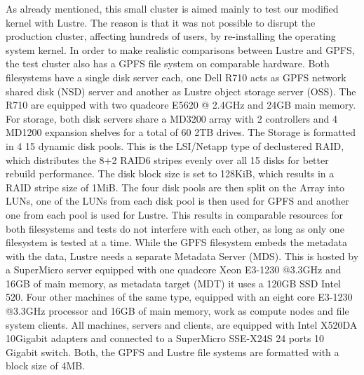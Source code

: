 As already mentioned, this small cluster is aimed mainly to test our modified kernel with Lustre. 
The reason is that it was not possible to disrupt the production cluster, affecting hundreds of users, by re-installing the operating system kernel.
In order to make realistic comparisons between Lustre and GPFS, the test cluster also has a GPFS file system on comparable hardware. 
Both filesystems have a single disk server each, one Dell R710 acts as GPFS network shared disk (NSD) server and another as Lustre object storage server (OSS). The R710 are equipped with two quadcore E5620 @ 2.4GHz and 24GB main memory. For storage, both disk servers share a MD3200 array with 2 controllers and 4 MD1200 expansion shelves for a total of 60 2TB drives. The Storage is formatted in 4 15 dynamic disk pools. This is the LSI/Netapp type of declustered RAID, which distributes the 8+2 RAID6 stripes evenly over all 15 disks for better rebuild performance. The disk block size is set to 128KiB, which results in a RAID stripe size of 1MiB. The four disk pools are then split on the Array into LUNs, one of the LUNs from each disk pool is then used for GPFS and another one from each pool is used for Lustre. This results in comparable resources for both filesystems and tests do not interfere with each other, as long as only one filesystem is tested at a time. While the GPFS filesystem embeds the metadata with the data, Lustre needs a separate Metadata Server (MDS). This is hosted by a SuperMicro server equipped with one quadcore Xeon E3-1230 @3.3GHz and 16GB of main memory, as metadata target (MDT) it uses a 120GB SSD Intel 520. Four other machines of the same type, equipped with an eight core E3-1230 @3.3GHz processor and 16GB of main memory, work as compute nodes and file system clients. All machines, servers and clients, are equipped with Intel X520DA 10Gigabit adapters and connected to a SuperMicro SSE-X24S 24 ports 10 Gigabit switch. Both, the GPFS and Lustre file systems are formatted with a block size of 4MB.

 

